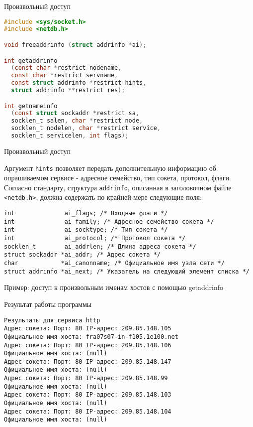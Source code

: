 \begin{frame}[fragile]{Произвольный доступ}
\scriptsize\begin{lstlisting}[language=C]
#include <sys/socket.h>
#include <netdb.h>

void freeaddrinfo (struct addrinfo *ai);

int getaddrinfo 
  (const char *restrict nodename, 
  const char *restrict servname,
  const struct addrinfo *restrict hints,
  struct addrinfo **restrict res);

int getnameinfo 
  (const struct sockaddr *restrict sa, 
  socklen_t salen, char *restrict node, 
  socklen_t nodelen, char *restrict service,
  socklen_t servicelen, int flags);
\end{lstlisting}
\end{frame}

\begin{frame}[fragile]{Произвольный доступ}

Аргумент {\tt hints} позволяет передать дополнительную информацию об опрашиваемом сервисе - адресное семейство, тип сокета, протокол, флаги. 
Согласно стандарту, структура {\tt addrinfo}, описанная в заголовочном файле {\tt <netdb.h>}, должна содержать по крайней мере следующие поля: 

\scriptsize\begin{verbatim}
int              ai_flags; /* Входные флаги */
int              ai_family; /* Адресное семейство сокета */
int              ai_socktype; /* Тип сокета */
int              ai_protocol; /* Протокол сокета */
socklen_t        ai_addrlen; /* Длина адреса сокета */
struct sockaddr *ai_addr; /* Адрес сокета */
char            *ai_canonname; /* Официальное имя узла сети */
struct addrinfo *ai_next; /* Указатель на следующий элемент списка */
\end{verbatim}
\end{frame}

\begin{frame}[fragile]{Пример: доступ к произвольным именам хостов с помощью getaddrinfo}
\tiny
\end{frame}

\begin{frame}[fragile]{Результат работы программы}
\scriptsize\begin{verbatim}
Результаты для сервиса http
Адрес сокета: Порт: 80 IP-адрес: 209.85.148.105
Официальное имя хоста: fra07s07-in-f105.1e100.net
Адрес сокета: Порт: 80 IP-адрес: 209.85.148.106
Официальное имя хоста: (null)
Адрес сокета: Порт: 80 IP-адрес: 209.85.148.147
Официальное имя хоста: (null)
Адрес сокета: Порт: 80 IP-адрес: 209.85.148.99
Официальное имя хоста: (null)
Адрес сокета: Порт: 80 IP-адрес: 209.85.148.103
Официальное имя хоста: (null)
Адрес сокета: Порт: 80 IP-адрес: 209.85.148.104
Официальное имя хоста: (null)
\end{verbatim}
\end{frame}

